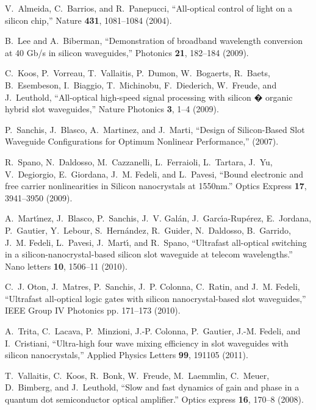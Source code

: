 \documentclass[10pt,letterpaper]{article}
\begin{document}
\begin{thebibliography}{10}
\newcommand{\enquote}[1]{``#1''}

V.~Almeida, C.~Barrios, and R.~Panepucci, \enquote{{All-optical control of
  light on a silicon chip},} Nature \textbf{431}, 1081--1084 (2004).

B.~Lee and A.~Biberman, \enquote{{Demonstration of broadband wavelength
  conversion at 40 Gb/s in silicon waveguides},} Photonics \textbf{21},
  182--184 (2009).

C.~Koos, P.~Vorreau, T.~Vallaitis, P.~Dumon, W.~Bogaerts, R.~Baets,
  B.~Esembeson, I.~Biaggio, T.~Michinobu, F.~Diederich, W.~Freude, and
  J.~Leuthold, \enquote{{All-optical high-speed signal processing with silicon
  � organic hybrid slot waveguides},} Nature Photonics \textbf{3}, 1--4
  (2009).

P.~Sanchis, J.~Blasco, A.~Martinez, and J.~Marti, \enquote{{Design of
  Silicon-Based Slot Waveguide Configurations for Optimum Nonlinear
  Performance},}  (2007).

R.~Spano, N.~Daldosso, M.~Cazzanelli, L.~Ferraioli, L.~Tartara, J.~Yu,
  V.~Degiorgio, E.~Giordana, J.~M. Fedeli, and L.~Pavesi, \enquote{{Bound
  electronic and free carrier nonlinearities in Silicon nanocrystals at
  1550nm.}} Optics Express \textbf{17}, 3941--3950 (2009).

A.~Mart\'{\i}nez, J.~Blasco, P.~Sanchis, J.~V. Gal\'{a}n,
  J.~Garc\'{\i}a-Rup\'{e}rez, E.~Jordana, P.~Gautier, Y.~Lebour,
  S.~Hern\'{a}ndez, R.~Guider, N.~Daldosso, B.~Garrido, J.~M. Fedeli,
  L.~Pavesi, J.~Mart\'{\i}, and R.~Spano, \enquote{{Ultrafast all-optical
  switching in a silicon-nanocrystal-based silicon slot waveguide at telecom
  wavelengths.}} Nano letters \textbf{10}, 1506--11 (2010).

C.~J. Oton, J.~Matres, P.~Sanchis, J.~P. Colonna, C.~Ratin, and J.~M. Fedeli,
  \enquote{{Ultrafast all-optical logic gates with silicon nanocrystal-based
  slot waveguides},} IEEE Group IV Photonics pp. 171--173 (2010).

A.~Trita, C.~Lacava, P.~Minzioni, J.-P. Colonna, P.~Gautier, J.-M. Fedeli, and
  I.~Cristiani, \enquote{{Ultra-high four wave mixing efficiency in slot
  waveguides with silicon nanocrystals},} Applied Physics Letters \textbf{99},
  191105 (2011).

T.~Vallaitis, C.~Koos, R.~Bonk, W.~Freude, M.~Laemmlin, C.~Meuer, D.~Bimberg,
  and J.~Leuthold, \enquote{{Slow and fast dynamics of gain and phase in a
  quantum dot semiconductor optical amplifier.}} Optics express \textbf{16},
  170--8 (2008).


\end{thebibliography}
\end{document}
